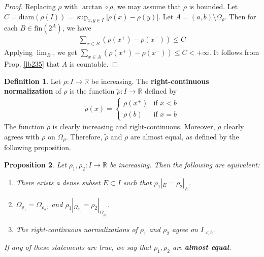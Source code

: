 \documentclass[12pt,b5paper,notitlepage]{article}
\theoremstyle{definition}
\newtheorem{df}{Definition}[subsection]
\theoremstyle{plain}
\newtheorem{pp}[df]{Proposition}
\newcommand{\wtd}{\widetilde}
\newcommand{\Rbb}{\mathbb R}
\newcommand{\fin}{\mathrm{fin}}
\newcommand{\diam}{\mathrm{diam}}
\numberwithin{equation}{section}
\begin{document}
\begin{proof}
Replacing $\rho$ with $\arctan\circ\rho$, we may assume that $\rho$ is bounded. Let $C=\diam(\rho(I))=\sup_{x,y\in I}|\rho(x)-\rho(y)|$. Let $A=(a,b)\setminus\Omega_\rho$. Then for each $B\in\fin(2^A)$, we have
\begin{align*}
\sum_{x\in B}(\rho(x^+)-\rho(x^-))\leq C
\end{align*}
Applying $\lim_B$, we get $\sum_{x\in A}(\rho(x^+)-\rho(x^-))\leq C<+\infty$. It follows from Prop. \ref{lb235} that $A$ is countable.
\end{proof}


\begin{df}
Let $\rho:I\rightarrow\Rbb$ be increasing. The \textbf{right-continuous normalization}  of $\rho$ is the function $\wtd\rho:I\rightarrow \Rbb$ defined by
\begin{gather*}
\wtd\rho(x)=\left\{
\begin{array}{ll}
\rho(x^+)&\text{if }x<b\\[0.5ex]
\rho(b)&\text{if }x=b
\end{array}
\right.
\end{gather*}
The function $\wtd\rho$ is clearly increasing and right-continuous. Moreover, $\wtd\rho$ clearly agrees with $\rho$ on $\Omega_\rho$. Therefore, $\wtd\rho$ and $\rho$ are almost equal, as defined by the following proposition.
\end{df}



\begin{pp}\label{lb70}
Let $\rho_1,\rho_2:I\rightarrow\Rbb$ be increasing. Then the following are equivalent:
\begin{enumerate}[label=(\alph*)]
\item There exists a dense subset $E\subset I$ such that $\rho_1|_E=\rho_2|_E$.
\item $\Omega_{\rho_1}=\Omega_{\rho_2}$, and $\rho_1|_{\Omega_{\rho_1}}=\rho_2|_{\Omega_{\rho_2}}$.
\item The right-continuous normalizations of $\rho_1$ and $\rho_2$ agree on $I_{<b}$.
\end{enumerate}
If any of these statements are true, we say that $\rho_1,\rho_2$ are \textbf{almost equal}. 
\end{pp}
\end{document}
